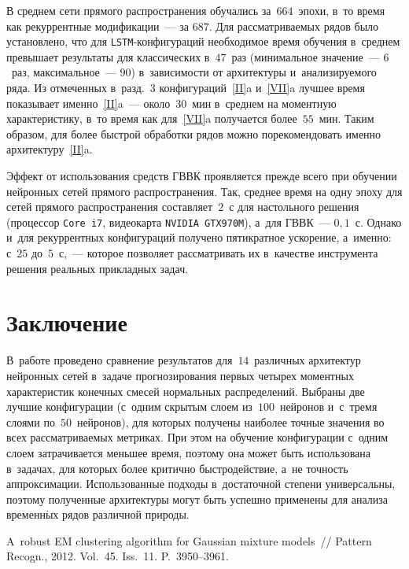 \begin{multicols}{2}
В среднем сети прямого распространения обуча\-лись за~$664$~эпохи, в~то время как 
рекуррентные модификации~--- за $687$. Для рассматриваемых рядов было установлено, 
что для \verb"LSTM"-кон\-фи\-гу\-ра\-ций необходимое время обучения в~среднем 
превышает результаты для классических в~$47$~раз (минимальное значение~--- $6$~раз, 
максимальное~--- $90$) в~за\-ви\-си\-мости от архитектуры и~анализируемого ряда. Из  
отмеченных в~разд.~3 конфигураций~\ref{II}{a} и~\ref{VII}{a} 
лучшее время показывает именно~\ref{II}{a}~--- около~$30$~мин в~среднем на 
моментную характеристику, в~то время как для~\ref{VII}{a} получается более~$55$~мин. 
Таким образом, для более быстрой обработки рядов можно порекомендовать именно 
архитектуру~\ref{II}{a}.

Эффект от использования средств ГВВК проявляется прежде всего при обучении нейронных 
сетей прямого распространения. Так, среднее время на одну эпоху для 
сетей прямого распространения составляет~$2$~с для настольного решения 
(процессор \verb"Core i7", видеокарта \verb"NVIDIA GTX970M"), а~для ГВВК~--- 
$0{,}1$~с. Однако и~для рекуррентных конфигураций получено пятикратное ускорение,
 а~именно: с~$25$ до~$5$~с,~--- которое позволяет рассматривать их в~качестве инструмента 
 решения реальных прикладных задач.


\section{Заключение}

В~работе проведено сравнение результатов для~$14$~различных архитектур нейронных 
сетей в~задаче прогнозирования первых четырех моментных характеристик конечных 
смесей нормальных распределений. Выбраны две лучшие конфигурации 
(с~одним скрытым слоем из~$100$~нейронов и~с~тремя слоями по~$50$~нейронов), 
для которых получены наиболее точные значения во всех рас\-смат\-ри\-ва\-емых метриках. 
При этом на обучение конфигурации с~одним слоем затрачивается меньшее время, 
поэтому она может быть использована в~задачах, для которых более критично 
быстродействие, а~не точ\-ность аппроксимации. Использованные подходы в~достаточной 
степени универсальны, поэтому полученные архитектуры могут быть успешно 
применены для анализа временн$\acute{\mbox{ы}}$х рядов различной природы.


{\small\frenchspacing
 {%
 \begin{thebibliography}{99}
  
A~robust EM clustering algorithm for Gaussian mixture models~// 
Pattern Recogn., 2012. Vol.~45. Iss.~11. P.~3950--3961.


\end{thebibliography}}}
\end{multicols}
